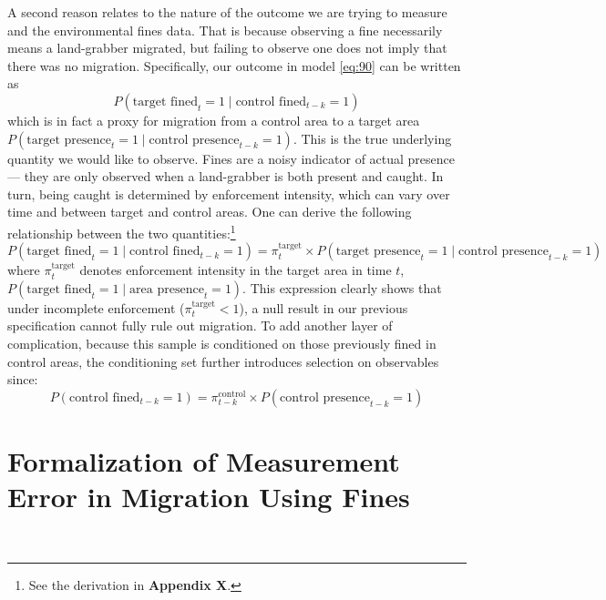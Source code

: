 \documentclass[12pt]{article}
\begin{document}
\quad A second reason relates to the nature of the outcome we are trying to measure and the environmental fines data. That is because observing a fine necessarily means a land-grabber migrated, but failing to observe one does not imply that there was no migration. Specifically, our outcome in model \eqref{eq:90} can be written as
\begin{equation*}
    P(\text{target fined}_t = 1 \mid \text{control fined}_{t-k} = 1)
\end{equation*}
which is in fact a proxy for migration from a control area to a target area $P(\text{target presence}_t = 1 \mid \text{control presence}_{t-k} = 1)$. This is the true underlying quantity we would like to observe. Fines are a noisy indicator of actual presence --- they are only observed when a land-grabber is both present and caught. In turn, being caught is determined by enforcement intensity, which can vary over time and between target and control areas. One can derive the following relationship between the two quantities:\footnote{See the derivation in \textbf{Appendix X}.}
\begin{equation*}
    P(\text{target fined}_t = 1 \mid \text{control fined}_{t-k} = 1)=\pi^{\text{target}}_t \times P(\text{target presence}_t = 1 \mid \text{control presence}_{t-k} = 1)
\end{equation*}
where $\pi^{\text{target}}_t$ denotes enforcement intensity in the target area in time $t$, $P(\text{target fined}_t=1\mid \text{area presence}_t=1)$. This expression clearly shows that under incomplete enforcement ($\pi_t^{\text{target}}<1$), a null result in our previous specification cannot fully rule out migration. To add another layer of complication, because this sample is conditioned on those previously fined in control areas, the conditioning set further introduces selection on observables since:
\begin{equation*}
P(\text{control fined}_{t-k}=1)=\pi_{t-k}^{\text{control}}\times P(\text{control presence}_{t-k}=1)
\end{equation*}

\section*{Formalization of Measurement Error in Migration Using Fines}
\
\end{document}
